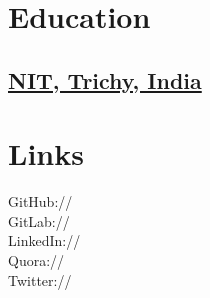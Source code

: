 \documentclass[]{deedy-resume-openfont}
\begin{document}
%
%
\lastupdated

%
%



%
%

\begin{minipage}[t]{0.33\textwidth} 


\section{Education} 

\subsection {\href{http://www.nitt.edu/}{NIT, Trichy, India}}


\section{Links} 
GitHub:// \href{https://github.com/tushar-rishav}{} \\
GitLab:// \href{https://gitlab.com/tushar-rishav}{} \\
LinkedIn://  \href{https://www.linkedin.com/in/tusharrishav}{} \\
Quora:// \href{https://www.quora.com/profile/Tushar-50}{} \\
Twitter:// \href{https://twitter.com/tushar\_rishav}{}
\sectionsep



\end{minipage}
\end{document}
